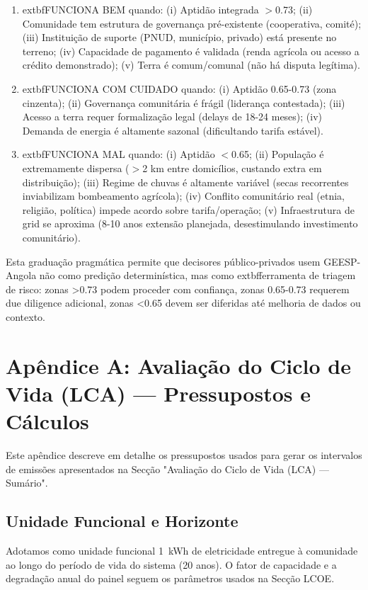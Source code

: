 \documentclass[12pt, a4paper]{article}
\begin{document}
{{{{{{{{{{{{\begin{enumerate}
\item 	extbf{FUNCIONA BEM} quando: (i) Aptidão integrada $>$0.73; (ii) Comunidade tem estrutura de governança pré-existente (cooperativa, comité); (iii) Instituição de suporte (PNUD, município, privado) está presente no terreno; (iv) Capacidade de pagamento é validada (renda agrícola ou acesso a crédito demonstrado); (v) Terra é comum/comunal (não há disputa legítima).

\item 	extbf{FUNCIONA COM CUIDADO} quando: (i) Aptidão 0.65-0.73 (zona cinzenta); (ii) Governança comunitária é frágil (liderança contestada); (iii) Acesso a terra requer formalização legal (delays de 18-24 meses); (iv) Demanda de energia é altamente sazonal (dificultando tarifa estável).

\item 	extbf{FUNCIONA MAL} quando: (i) Aptidão $<$0.65; (ii) População é extremamente dispersa ($>$2 km entre domicílios, custando extra em distribuição); (iii) Regime de chuvas é altamente variável (secas recorrentes inviabilizam bombeamento agrícola); (iv) Conflito comunitário real (etnia, religião, política) impede acordo sobre tarifa/operação; (v) Infraestrutura de grid se aproxima (8-10 anos extensão planejada, desestimulando investimento comunitário).

\end{enumerate}

Esta graduação pragmática permite que decisores público-privados usem GEESP-Angola não como predição determinística, mas como 	extbf{ferramenta de triagem de risco}: zonas >0.73 podem proceder com confiança, zonas 0.65-0.73 requerem due diligence adicional, zonas <0.65 devem ser diferidas até melhoria de dados ou contexto.

\clearpage
\appendix
\section{Apêndice A: Avaliação do Ciclo de Vida (LCA) — Pressupostos e Cálculos}
\label{app:lca}

Este apêndice descreve em detalhe os pressupostos usados para gerar os intervalos de
emissões apresentados na Secção "Avaliação do Ciclo de Vida (LCA) — Sumário".

\subsection{Unidade Funcional e Horizonte}
Adotamos como unidade funcional 1~kWh de eletricidade entregue à comunidade ao longo do
período de vida do sistema (20 anos). O fator de capacidade e a degradação anual do painel
seguem os parâmetros usados na Secção LCOE.

}}}}}}}}}}}}
\end{document}
